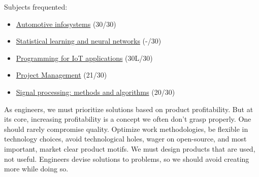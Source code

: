 \documentclass[10pt,a4paper,ragged2e,withhyper]{altacv}
\begin{document}
\begin{paracol}{2}
Subjects frequented:

\small
\begin{itemize}
  \item \href{https://didattica.polito.it/pls/portal30/gap.pkg_guide.viewGap?p_cod_ins=01NIFLO}{Automotive infosystems} (30/30)
  \item \href{https://didattica.polito.it/pls/portal30/gap.pkg_guide.viewGap?p_cod_ins=01SOVBH&p_a_acc=2019&p_header=S}{Statistical learning and neural networks} (-/30)
  \item \href{https://didattica.polito.it/pls/portal30/sviluppo.guide.visualizza?p_cod_ins=01QWRMV&p_a_acc=2018&p_lang=EN}{Programming for IoT applications} (30L/30)
  \item \href{https://didattica.polito.it/pls/portal30/sviluppo.guide.visualizza?p_cod_ins=04IXTPH&p_a_acc=2013}{Project Management} (21/30)
  \item \href{https://didattica.polito.it/pls/portal30/sviluppo.guide.visualizza?p_cod_ins=01QWFBG&p_a_acc=2016&p_lang=EN}{Signal processing: methods and algorithms} (20/30)
\end{itemize}

\divider


\switchcolumn



As engineers, we must prioritize solutions based on product profitability. 
But at its core, increasing profitability is a concept we often don't grasp properly. 
One should rarely compromise quality. Optimize work methodologies, be flexible in technology choices, avoid technological holes, wager on open-source, and most important, market clear product motifs. 
We must design products that are used, not useful. 
Engineers devise solutions to problems, so we should avoid creating more while doing so.





\end{paracol}
\end{document}
